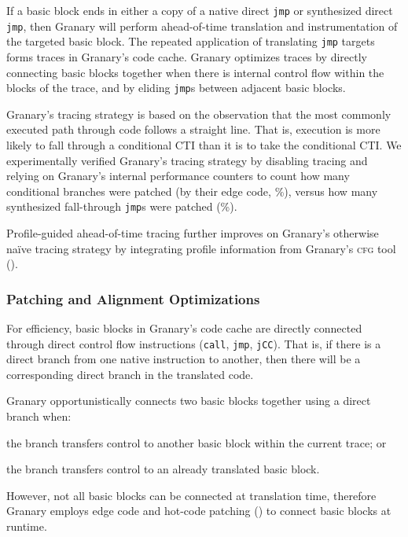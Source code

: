 \documentclass[preprint]{sigplanconf}
\newcommand{\toolname}[1]{{\scshape #1}}
\begin{document}
If a basic block ends in either a copy of a native direct \texttt{jmp} or synthesized direct \texttt{jmp}, then Granary will perform ahead-of-time translation and instrumentation of the targeted basic block. The repeated application of translating \texttt{jmp} targets forms traces in Granary's code cache. Granary optimizes traces by directly connecting basic blocks together when there is internal control flow within the blocks of the trace, and by eliding \texttt{jmp}s between adjacent basic blocks.

Granary's tracing strategy is based on the observation that the most commonly executed path through code follows a straight line. That is, execution is more likely to fall through a conditional CTI than it is to take the conditional CTI. We experimentally verified Granary's tracing strategy by disabling tracing and relying on Granary's internal performance counters to count how many conditional branches were patched (by their edge code, \%), versus how many synthesized fall-through \texttt{jmp}s were patched (\%).

Profile-guided ahead-of-time tracing further improves on Granary's otherwise na\"{i}ve tracing strategy by integrating profile information from Granary's \toolname{cfg} tool ().

\subsubsection{Patching and Alignment  Optimizations}\label{sec:patching}
For efficiency, basic blocks in Granary's code cache are directly connected through direct control flow instructions (\texttt{call}, \texttt{jmp}, \texttt{jCC}). That is, if there is a direct branch from one native instruction to another, then there will be a corresponding direct branch in the translated code.

Granary opportunistically connects two basic blocks together using a direct branch when: \begin{inparaenum}[i)]
	\item the branch transfers control to another basic block within the current trace; or
	\item the branch transfers control to an already translated basic block.
\end{inparaenum} However, not all basic blocks can be connected at translation time, therefore Granary employs edge code and hot-code patching () to connect basic blocks at runtime.
\end{document}

